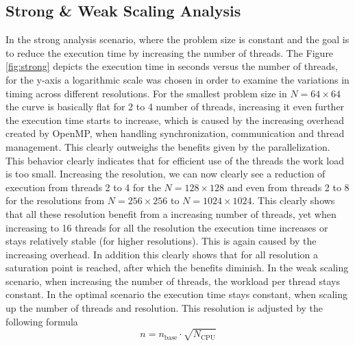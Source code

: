 \subsection{Strong \& Weak Scaling Analysis}
In the strong analysis scenario, where the problem size is constant and the goal is to reduce the execution time by increasing the number of threads. The Figure \ref{fig:strong} depicts the execution time in seconds versus the number of threads, for the y-axis a logarithmic scale was chosen in order to examine the variations in timing across different resolutions.\newline
For the smallest problem size in $N=64\times64$ the curve is basically flat for 2 to 4 number of threads, increasing it even further the execution time starts to increase, which is caused by the increasing overhead created by OpenMP, when handling synchronization, communication and thread management. This clearly outweighs the benefits given by the parallelization. This behavior clearly indicates that for efficient use of the threads the work load is too small. Increasing the resolution, we can now clearly see a reduction of execution from threads 2 to 4 for the $N=128 \times 128$ and even from threads 2 to 8 for the resolutions from $N=256\times256$ to $N=1024\times1024$. This clearly shows that all these resolution benefit from a increasing number of threads, yet when increasing to 16 threads for all the resolution the execution time increases or stays relatively stable (for higher resolutions). This is again caused by the increasing overhead. In addition this clearly shows that for all resolution a saturation point is reached, after which the benefits diminish. \newline
\newline
In the weak scaling scenario, when increasing the number of threads, the workload per thread stays constant. In the optimal scenario the execution time stays constant, when scaling up the number of threads and resolution. This resolution is adjusted by the following formula
\begin{equation}
	n = n_{\text{base}} \cdot \sqrt{N_{\text{CPU}}}
\end{equation}
